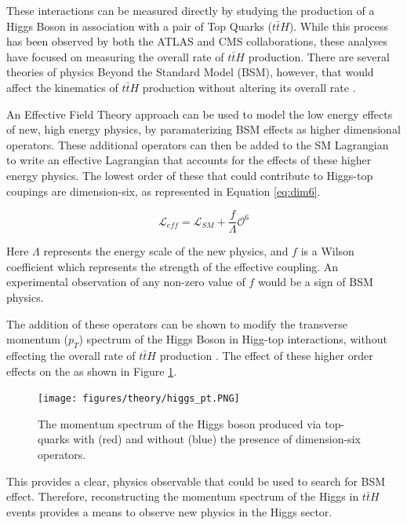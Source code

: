 These interactions can be measured directly by studying the production of a Higgs Boson in association with a pair of Top Quarks ($t\bar{t}H$). While this process has been observed by both the ATLAS \cite{ttH_paper} and CMS \cite{Sirunyan_2018} collaborations, these analyses have focused on measuring the overall rate of $t\bar{t}H$ production. There are several theories of physics Beyond the Standard Model (BSM), however, that would affect the kinematics of $t\bar{t}H$ production without altering its overall rate \cite{Dumont_2013}.

An Effective Field Theory approach can be used to model the low energy effects of new, high energy physics, by paramaterizing BSM effects as higher dimensional operators. These additional operators can then be added to the SM Lagrangian to write an effective Lagrangian that accounts for the effects of these higher energy physics. The lowest order of these that could contribute to Higgs-top coupings are dimension-six, as represented in Equation \ref{eq:dim6}.

\begin{equation}
\label{eq:dim6}
\mathcal{L}_{eff} = \mathcal{L}_{SM} + \frac{f}{\Lambda}\mathcal{O}^6
\end{equation}

Here $\Lambda$ represents the energy scale of the new physics, and $f$ is a Wilson coefficient which represents the strength of the effective coupling. An experimental observation of any non-zero value of $f$ would be a sign of BSM physics.

The addition of these operators can be shown to modify the transverse momentum ($p_T$) spectrum of the Higgs Boson in Higg-top interactions, without effecting the overall rate of $t\bar{t}H$ production \cite{Banerjee_2014}. The effect of these higher order effects on the  as shown in Figure \ref{fig:eft_pt}. 

\begin{figure}[H]
\centering
   \texttt{[image: figures/theory/higgs\_pt.PNG]}
\caption{The momentum spectrum of the Higgs boson produced via top-quarks with (red) and without (blue) the presence of dimension-six operators.}
\label{fig:eft_pt}
\end{figure}


This provides a clear, physics observable that could be used to search for BSM effect. Therefore, reconstructing the momentum spectrum of the Higgs in $t\bar{t}H$ events provides a means to observe new physics in the Higgs sector.



